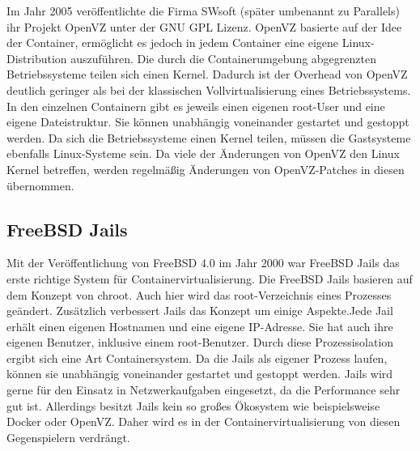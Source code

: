 Im Jahr 2005 veröffentlichte die Firma SWsoft (später umbenannt zu Parallels) ihr Projekt OpenVZ unter der GNU GPL Lizenz. OpenVZ basierte auf der Idee der Container, ermöglicht es jedoch in jedem Container eine eigene Linux-Distribution auszuführen.
Die durch die Containerumgebung abgegrenzten Betriebssysteme teilen sich einen Kernel. Dadurch ist der Overhead von OpenVZ deutlich geringer als bei der klassischen Vollvirtualisierung eines Betriebssystems.
In den einzelnen Containern gibt es jeweils einen eigenen root-User und eine eigene Dateistruktur.
Sie können unabhängig voneinander gestartet und gestoppt werden.
Da sich die Betriebssysteme einen Kernel teilen, müssen die Gastsysteme ebenfalls Linux-Systeme sein.
Da viele der Änderungen von OpenVZ den Linux Kernel betreffen, werden regelmäßig Änderungen von OpenVZ-Patches in diesen übernommen. \citep{OpenVzNews, IEEE4803091,OpenVzHist}


\subsection*{FreeBSD Jails}
\label{sec:jails}
Mit der Veröffentlichung von FreeBSD 4.0 im Jahr 2000 war FreeBSD Jails das erste richtige System für Containervirtualisierung.
Die FreeBSD Jails basieren auf dem Konzept von chroot. Auch hier wird das root-Verzeichnis eines Prozesses geändert. Zusätzlich verbessert Jails das Konzept um einige Aspekte.Jede Jail erhält einen eigenen Hostnamen	und eine eigene IP-Adresse. Sie hat auch ihre eigenen Benutzer, inklusive einem root-Benutzer. \citep{FreeBSDHB14} Durch diese Prozessisolation ergibt sich eine Art Containersystem. Da die Jails als eigener Prozess laufen, können sie unabhängig voneinander gestartet und gestoppt werden.  Jails wird gerne für den Einsatz in Netzwerkaufgaben eingesetzt, da die Performance sehr gut ist. Allerdings besitzt Jails kein so großes Ökosystem wie beispielsweise Docker oder OpenVZ. Daher wird es in der Containervirtualisierung von diesen Gegenspielern verdrängt.


